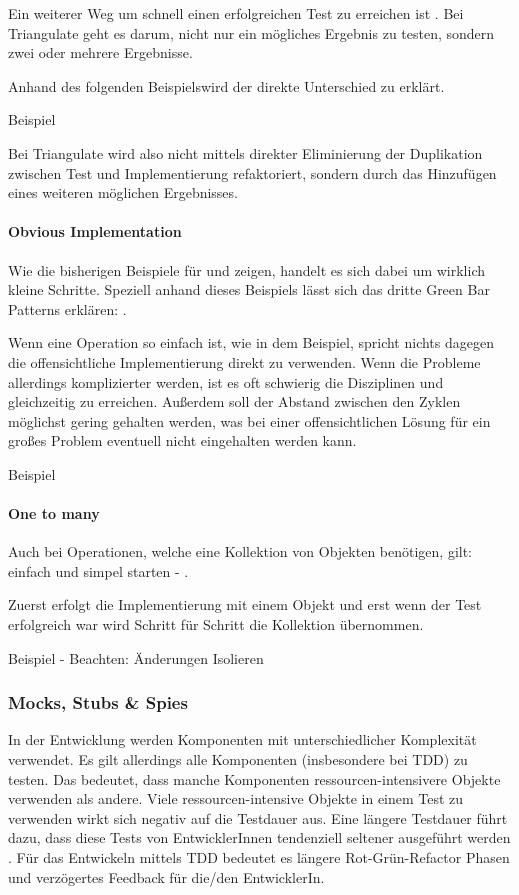 Ein weiterer Weg um schnell einen erfolgreichen Test zu erreichen ist . Bei Triangulate geht es darum, nicht nur ein mögliches Ergebnis zu testen, sondern zwei oder mehrere Ergebnisse.

Anhand des folgenden Beispielswird der direkte Unterschied zu  erklärt.

Beispiel

Bei Triangulate wird also nicht mittels direkter Eliminierung der Duplikation zwischen Test und Implementierung refaktoriert, sondern durch das Hinzufügen eines weiteren möglichen Ergebnisses.

\paragraph{Obvious Implementation}

Wie die bisherigen Beispiele für  und  zeigen, handelt es sich dabei um wirklich kleine Schritte. Speziell anhand dieses Beispiels lässt sich das dritte Green Bar Patterns erklären: .

Wenn eine Operation so einfach ist, wie in dem Beispiel, spricht nichts dagegen die offensichtliche Implementierung direkt zu verwenden.
Wenn die Probleme allerdings komplizierter werden, ist es oft schwierig die Disziplinen  und  gleichzeitig zu erreichen. Außerdem soll der Abstand zwischen den Zyklen möglichst gering gehalten werden, was bei einer offensichtlichen Lösung für ein großes Problem eventuell nicht eingehalten werden kann.

Beispiel

\paragraph{One to many}

Auch bei Operationen, welche eine Kollektion von Objekten benötigen, gilt: einfach und simpel starten - \autocite[154]{Beck:2003}.

Zuerst erfolgt die Implementierung mit einem Objekt und erst wenn der Test erfolgreich war wird Schritt für Schritt die Kollektion übernommen.

Beispiel - Beachten: Änderungen Isolieren

\subsubsection{Mocks, Stubs \& Spies}
In der Entwicklung werden Komponenten mit unterschiedlicher Komplexität verwendet. Es gilt allerdings alle Komponenten (insbesondere bei TDD) zu testen. Das bedeutet, dass manche Komponenten ressourcen-intensivere Objekte verwenden als andere. Viele ressourcen-intensive Objekte in einem Test zu verwenden wirkt sich negativ auf die Testdauer aus. Eine längere Testdauer führt dazu, dass diese Tests von EntwicklerInnen tendenziell seltener ausgeführt werden \autocite{Beck:2003}. Für das Entwickeln mittels TDD bedeutet es längere Rot-Grün-Refactor Phasen und verzögertes Feedback für die/den EntwicklerIn.

